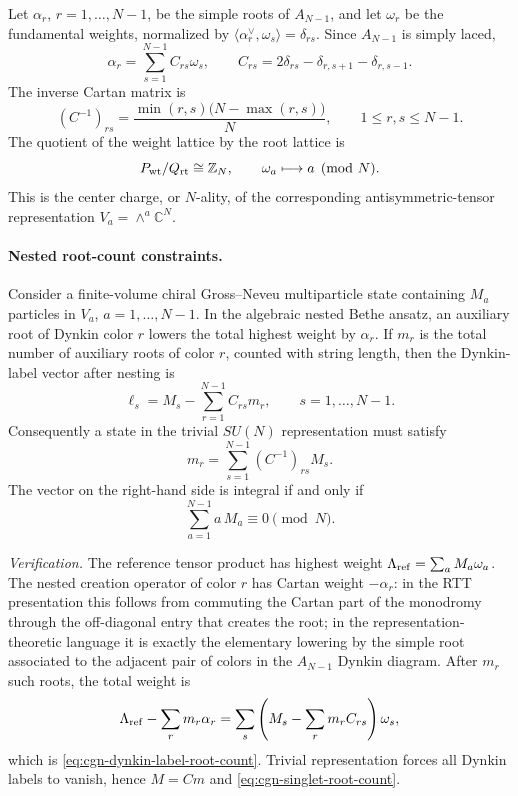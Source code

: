 Let \(\alpha_r\), \(r=1,\ldots,N-1\), be the simple roots of \(A_{N-1}\), and let
\(\omega_r\) be the fundamental weights, normalized by
\(\langle\alpha_r^\vee,\omega_s\rangle=\delta_{rs}\).  Since \(A_{N-1}\) is
simply laced,
\begin{equation}
  \alpha_r=\sum_{s=1}^{N-1} C_{rs}\omega_s,\qquad
  C_{rs}=2\delta_{rs}-\delta_{r,s+1}-\delta_{r,s-1}.
  \label{eq:su-n-cartan-fundamental-weight-basis}
\end{equation}
The inverse Cartan matrix is
\begin{equation}
  (C^{-1})_{rs}
  =
  \frac{\min(r,s)\bigl(N-\max(r,s)\bigr)}{N},
  \qquad 1\le r,s\le N-1 .
  \label{eq:su-n-inverse-cartan}
\end{equation}
The quotient of the weight lattice by the root lattice is
\[
  P_{\rm wt}/Q_{\rm rt}\cong \mathbb Z_N,\qquad
  \omega_a\longmapsto a\pmod N .
\]
This is the center charge, or \(N\)-ality, of the corresponding
antisymmetric-tensor representation \(V_a=\wedge^a\mathbb C^N\).

\paragraph{Nested root-count constraints.}
Consider a finite-volume chiral Gross--Neveu multiparticle state containing
\(M_a\) particles in \(V_a\), \(a=1,\ldots,N-1\).  In the algebraic nested Bethe
ansatz, an auxiliary root of Dynkin color \(r\) lowers the total highest weight
by \(\alpha_r\).  If \(m_r\) is the total number of auxiliary roots of color
\(r\), counted with string length, then the Dynkin-label vector after nesting is
\begin{equation}
  \ell_s=M_s-\sum_{r=1}^{N-1} C_{rs}m_r,\qquad s=1,\ldots,N-1.
  \label{eq:cgn-dynkin-label-root-count}
\end{equation}
Consequently a state in the trivial \(SU(N)\) representation must satisfy
\begin{equation}
  m_r=\sum_{s=1}^{N-1}(C^{-1})_{rs}M_s .
  \label{eq:cgn-singlet-root-count}
\end{equation}
The vector on the right-hand side is integral if and only if
\begin{equation}
  \sum_{a=1}^{N-1}a\,M_a\equiv0\pmod N .
  \label{eq:su-n-nality-zero-condition}
\end{equation}

\emph{Verification.}
The reference tensor product has highest weight
\(\Lambda_{\rm ref}=\sum_a M_a\omega_a\).  The nested creation operator of color
\(r\) has Cartan weight \(-\alpha_r\): in the RTT presentation this follows
from commuting the Cartan part of the monodromy through the off-diagonal entry
that creates the root; in the representation-theoretic language it is exactly
the elementary lowering by the simple root associated to the adjacent pair of
colors in the \(A_{N-1}\) Dynkin diagram.  After \(m_r\) such roots, the total
weight is
\[
  \Lambda_{\rm ref}-\sum_r m_r\alpha_r
  =
  \sum_s\left(M_s-\sum_r m_r C_{rs}\right)\omega_s,
\]
which is \eqref{eq:cgn-dynkin-label-root-count}.  Trivial representation forces
all Dynkin labels to vanish, hence \(M=Cm\) and
\eqref{eq:cgn-singlet-root-count}.


